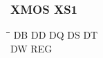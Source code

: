 \subsubsection{XMOS XS1}
{\tt\begin{tabbing}
\hspace{3cm}\=\hspace{3cm}\=\hspace{3cm}\=\hspace{3cm}\=\kill
DB         \> DD          \> DQ          \> DS          \> DT \\
DW         \> REG \\
\end{tabbing}}
